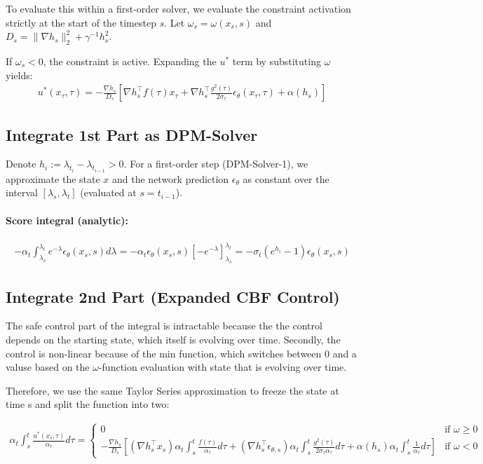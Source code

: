 \documentclass{article}
\begin{document}
To evaluate this within a first-order solver, we evaluate the constraint activation strictly at the start of the timestep $s$. Let $\omega_s = \omega(x_s, s)$ and $D_s = \|\nabla h_s\|_2^2 + \gamma^{-1}h_s^2$. 

If $\omega_s < 0$, the constraint is active. Expanding the $u^*$ term by substituting $\omega$ yields:
\begin{align}
u^*(x_\tau,\tau) = -\frac{\nabla h_s}{D_s}\left[ \nabla h_s^\top f(\tau)x_\tau + \nabla h_s^\top \frac{g^2(\tau)}{2\sigma_\tau}\epsilon_\theta(x_\tau,\tau) + \alpha(h_s) \right]
\end{align}

\subsection{Integrate 1st Part as DPM-Solver}

Denote $h_i := \lambda_{t_i} - \lambda_{t_{i-1}} > 0$. For a first-order step (DPM-Solver-1), we approximate the state $x$ and the network prediction $\epsilon_\theta$ as constant over the interval $[\lambda_s, \lambda_t]$ (evaluated at $s = t_{i-1}$).

\paragraph{Score integral (analytic):}
\begin{align}
-\alpha_t\int_{\lambda_s}^{\lambda_t} e^{-\lambda}\epsilon_\theta(x_s,s)d\lambda = -\alpha_t\epsilon_\theta(x_s,s)\left[-e^{-\lambda}\right]_{\lambda_s}^{\lambda_t} = -\sigma_t(e^{h_i}-1)\epsilon_\theta(x_s,s)
\end{align}

\subsection{Integrate 2nd Part (Expanded CBF Control)}

The safe control part of the integral is intractable because the the control depends on the starting state, which itself is evolving over time. Secondly, the control is non-linear because of the min function, which switches between 0 and a valuse based on the $\omega$-function evaluation with state that is evolving over time. 

Therefore, we use the same Taylor Series approximation to freeze the state at time s and split the function into two:

\begin{align}
    \alpha_t\int_{s}^{t} \frac{u^*(x_s,\tau)}{\alpha_\tau}d\tau = 
    \begin{cases}
    0 & \text{if }\omega \ge 0\\
    -\frac{\nabla h_s}{D_s} \left[ (\nabla h_s^\top x_s) \alpha_t\int_s^t \frac{f(\tau)}{\alpha_\tau}d\tau + (\nabla h_s^\top \epsilon_{\theta,s}) \alpha_t\int_s^t \frac{g^2(\tau)}{2\sigma_\tau\alpha_\tau}d\tau + \alpha(h_s) \alpha_t\int_s^t \frac{1}{\alpha_\tau}d\tau \right] & \text{if } \omega < 0
    \end{cases}
\end{align}
\end{document}
